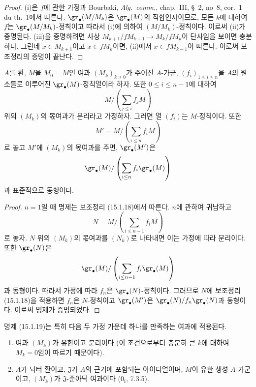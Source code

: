 \begin{proof}
(i)은 $f$에 관한 가정과 Bourbaki, \emph{Alg.~comm.}, chap.~III,
\S~2, no~8, cor.~1 du th.~1에서 따른다.
$\gr_\bullet(M/M_k)$은 $\gr_\bullet(M)$의 직합인자이므로, 모든
$k$에 대하여 $f$는 $\gr_\bullet(M/M_k)$-정칙이고 따라서 (i)에
의하여 $(M/M_k)$-정칙이다. 이로써 (ii)가 증명된다. (iii)을
증명하려면 사상
$M_{k+1}/fM_{k+1}\to M_k/fM_k$이 단사임을 보이면 충분하다.
그런데 $x\in M_{k+1}$이고 $x\in fM_k$이면, (ii)에서
$x\in fM_{k+1}$이 따른다. 이로써 보조정리의 증명이 끝난다.
\end{proof}

\begin{proposition}[15.1.19]
\label{0.15.1.19-fr}
$A$를 환, $M$을 $M_0=M$인 여과 $(M_k)_{k\geq0}$가 주어진
$A$-가군, $(f_i)_{1\leq i\leq n}$을 $A$의 원소들로 이루어진
$\gr_\bullet(M)$-정칙열이라 하자. 또한 $0\leq i\leq n-1$에 대하여
\[
  M/\left(\sum_{j\leq i}f_jM\right)
\]
위의 $(M_k)$의 몫여과가 분리라고 가정하자. 그러면 열 $(f_i)$는
$M$-정칙이다. 또한
\[
  M'=M/\left(\sum_{i\leq n}f_iM\right)
\]
로 놓고 $M'$에 $(M_k)$의 몫여과를 주면, $\gr_\bullet(M')$은
\[
  \gr_\bullet(M)/
  \left(\sum_{i\leq n}f_i\gr_\bullet(M)\right)
\]
과 표준적으로 동형이다.
\end{proposition}

\begin{proof}
$n=1$일 때 명제는 보조정리 (15.1.18)에서 따른다. $n$에 관하여
귀납하고
\[
  N=M/\left(\sum_{i\leq n-1}f_iM\right)
\]
로 놓자. $N$ 위의 $(M_k)$의 몫여과를 $(N_k)$로 나타내면 이는 가정에
따라 분리이다. 또한 $\gr_\bullet(N)$은
\[
  \gr_\bullet(M)/
  \left(\sum_{i\leq n-1}f_i\gr_\bullet(M)\right)
\]
과 동형이다. 따라서 가정에 따라 $f_n$은
$\gr_\bullet(N)$-정칙이다. 그러므로 $N$에 보조정리 (15.1.18)을
적용하면 $f_n$은 $N$-정칙이고 $\gr_\bullet(M')$은
$\gr_\bullet(N)/f_n\gr_\bullet(N)$과 동형이다. 이로써 명제가
증명되었다.
\end{proof}

명제 (15.1.19)는 특히 다음 두 가정 가운데 하나를 만족하는 여과에
적용된다.
\begin{enumerate}
  \item[$1^\circ$] 여과 $(M_k)$가 유한이고 분리이다 (이 조건으로부터
  충분히 큰 $k$에 대하여 $M_k=0$임이 따르기 때문이다).
  \item[$2^\circ$] $A$가 뇌터 환이고, $\mathfrak{J}$가 $A$의
  근기에 포함되는 아이디얼이며, $M$이 유한 생성 $A$-가군이고,
  $(M_k)$가 $\mathfrak{J}$-준아딕 여과이다
  ($0_{\mathrm I}$, 7.3.5).
\end{enumerate}

